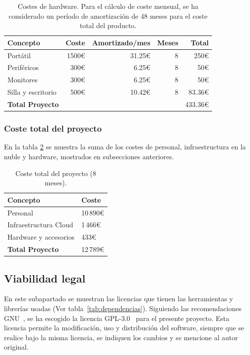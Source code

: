 \begin{table}[!ht]
	\centering
	\begin{tabular}{lrrrr}
		\toprule
		\textbf{Concepto} & \textbf{Coste} & \textbf{Amortizado/mes} & \textbf{Meses} & \textbf{Total} \\
		\midrule
		Portátil & 1500€ & 31.25€  & 8 & 250€\\
        Periféricos & 300€ & 6.25€  & 8 & 50€\\
        Monitores & 300€ & 6.25€  & 8 & 50€\\
        Silla y escritorio & 500€ & 10.42€  & 8 & 83.36€\\
        \midrule
		\textbf{Total Proyecto} & & & & 433.36€ \\
		\bottomrule
	\end{tabular}
	\caption[Costes de hardware]{Costes de hardware. Para el cálculo de coste mensual, se ha considerado un período de amortización de 48 meses para el coste total del producto.}
	\label{tab:hardware}
\end{table}


\subsubsection{Coste total del proyecto}

En la tabla \ref{tab:coste_total} se muestra la suma de los costes de personal, infraestructura en la nuble y hardware, mostrados en subsecciones anteriores.

\begin{table}[!ht]
	\centering
	\begin{tabular}{ll}
		\toprule
		\textbf{Concepto} & \textbf{Coste } \\
		\midrule
		Personal & 10\,890€\\
        Infraestructura Cloud &  1\,466€\\
        Hardware y accesorios & 433€\\
        \midrule
		\textbf{Total Proyecto} &  12\,789€ \\
		\bottomrule
	\end{tabular}
	\caption{Coste total del proyecto (8 meses).}
	\label{tab:coste_total}
\end{table}

\subsection{Viabilidad legal}

En este subapartado se muestran las licencias que tienen las herramientas y librerías usadas (Ver tabla~\ref{tab:dependencias}). Siguiendo las recomendaciones GNU~\cite{gnu}, se ha escogido la licencia GPL-3.0~\cite{gpl3} para el presente proyecto. Esta licencia permite la modificación, uso y distribución del software, siempre que se realice bajo la misma licencia, se indiquen los cambios y se mencione al autor original.


